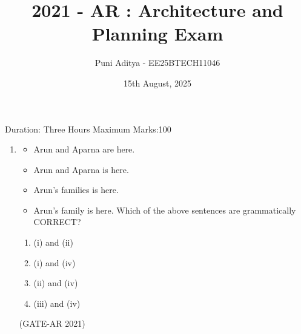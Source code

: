 \documentclass[a4paper,10pt]{article}
\begin{document}
\title{2021 - AR : Architecture and Planning Exam}
\author{Puni Aditya - EE25BTECH11046}
\date{15th August, 2025}
\maketitle
Duration: Three Hours \hfill Maximum Marks:100

\begin{enumerate}
    \item \begin{itemize}
    \item Arun and Aparna are here.
    \item Arun and Aparna is here.
    \item Arun's families is here.
    \item Arun's family is here.
    Which of the above sentences are grammatically CORRECT? \end{itemize}
    \begin{multicols}{4}
    \begin{enumerate}
        \item (i) and (ii)
        \item (i) and (iv)
        \item (ii) and (iv)
        \item (iii) and (iv)
    \end{enumerate}
    \end{multicols}
    \hfill (GATE-AR 2021)
    

\end{enumerate}
\end{document}
